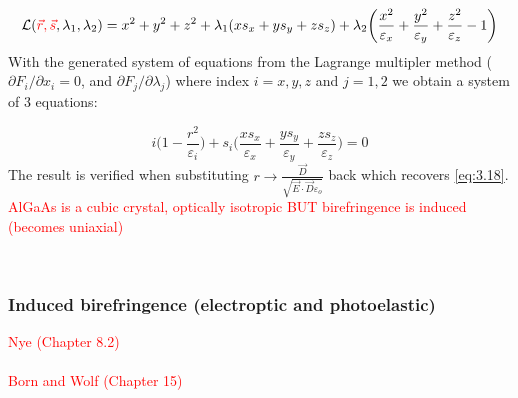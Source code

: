 \begin{equation}
\mathcal{L}(\textcolor{red}{\vec{r},\vec{s}},\lambda_1, \lambda_2) =
x^2 + y^2 + z^2 + \lambda_1 (xs_x + ys_y + zs_z) + \lambda_2 \bigg( \frac{x^2}{\varepsilon_x} + \frac{y^2}{\varepsilon_y} + \frac{z^2}{\varepsilon_z} - 1 \bigg)
\end{equation}
With the generated system of equations from the Lagrange multipler method ($\partial F_i/ \partial x_i = 0$, and $\partial F_j/ \partial \lambda_j$) where index $i =x,y,z$ and $j = 1,2$ we obtain a system of 3 equations:

\begin{equation}
i \bigg(1-\frac{r^2}{\varepsilon_{i}} \bigg) + s_{i} \bigg(\frac{x s_x}{\varepsilon_x} + \frac{y s_y}{\varepsilon_y} + \frac{z s_z}{\varepsilon_z} \bigg) = 0
\end{equation}
The result is verified when substituting $r \rightarrow \frac{\vec{D}}{\sqrt{\vec{E} \cdot \vec{D} \varepsilon_o}}$ back which recovers \ref{eq:3.18}.
\\
\textcolor{red}{AlGaAs is a cubic crystal, optically isotropic BUT birefringence is induced (becomes uniaxial)}

\\
\subsubsection{Induced birefringence (electroptic and photoelastic)}
\textcolor{red}{Nye (Chapter 8.2)}
\\
\\
\textcolor{red}{Born and Wolf (Chapter 15)}
\\
